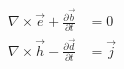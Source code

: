 \begin{equation}
\begin{split}
    \nabla \times \vec{e} + \frac{\partial \vec{b}}{\partial t} &= 0 \\
    \nabla \times \vec{h} - \frac{\partial \vec{d}}{\partial t} &= \vec{j}
\end{split}
\label{eq:maxwell_time_full}
\end{equation}

